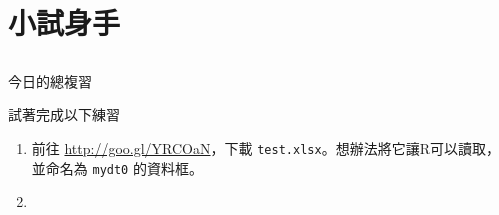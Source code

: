 \documentclass[12pt, aspectratio=43]{beamer}
\begin{document}
\section{小試身手}\subsection{}

\begin{frame}[fragile]{今日的總複習}
\begin{description}
\item[]
\end{description}
\end{frame}


\begin{frame}[fragile]{試著完成以下練習}
\begin{enumerate}
\item 前往 \url{http://goo.gl/YRCOaN}，下載 \verb+test.xlsx+。想辦法將它讓R可以讀取，並命名為 \verb+mydt0+ 的資料框。
\item 
\end{enumerate}
\end{frame}
\end{document}
